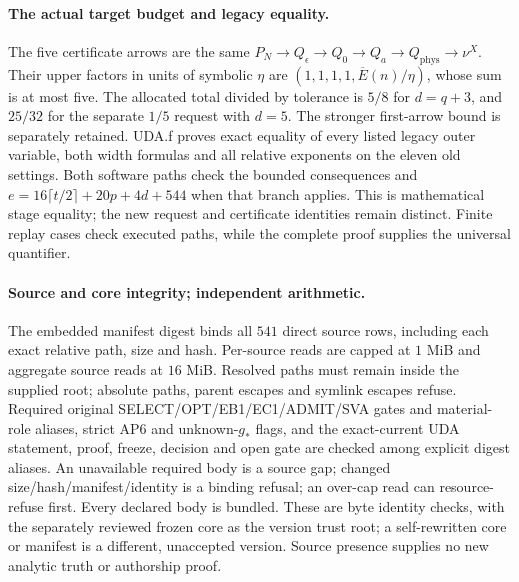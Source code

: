 \documentclass[11pt]{article}
\theoremstyle{plain}
\theoremstyle{definition}
\theoremstyle{remark}
\begin{document}
\paragraph{The actual target budget and legacy equality.}
The five certificate arrows are the same
$P_N\to Q_\epsilon\to Q_0\to Q_a\to Q_{\mathrm{phys}}\to\nu^X$.
Their upper factors in units of symbolic $\eta$ are
$(1,1,1,1,\overline E(n)/\eta)$, whose sum is at most five.
The allocated total divided by tolerance is $5/8$ for $d=q+3$, and
$25/32$ for the separate $1/5$ request with $d=5$.
The stronger first-arrow bound is separately retained. UDA.f proves exact
equality of every listed legacy outer variable, both width formulas and all
relative exponents on the eleven old settings. Both software paths check the
bounded consequences and $e=16\lceil t/2\rceil+20p+4d+544$ when that
branch applies. This is mathematical stage equality; the new request and
certificate identities remain distinct. Finite replay cases check executed
paths, while the complete proof supplies the universal quantifier.

\paragraph{Source and core integrity; independent arithmetic.}
The embedded manifest digest binds all $541$ direct source rows, including
each exact relative path, size and hash. Per-source reads are capped at
$1$ MiB and aggregate source reads at $16$ MiB. Resolved paths must remain
inside the supplied root; absolute paths, parent escapes and symlink escapes
refuse. Required original SELECT/OPT/EB1/EC1/ADMIT/SVA gates and material-role
aliases, strict AP6 and unknown-$g_*$ flags, and the exact-current UDA
statement, proof, freeze, decision and open gate are checked among explicit
digest aliases. An unavailable required body is a source gap; changed
size/hash/manifest/identity is a binding refusal; an over-cap read can
resource-refuse first. Every declared body is bundled. These are byte
identity checks, with the separately reviewed frozen core as the version
trust root; a self-rewritten core or manifest is a different, unaccepted
version. Source presence supplies no new analytic truth or authorship proof.
\end{document}
